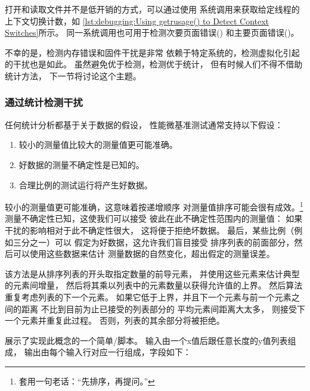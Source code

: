 打开和读取文件并不是低开销的方式，可以通过使用
系统调用来获取给定线程的上下文切换计数，如
\cref{lst:debugging:Using getrusage() to Detect Context Switches}所示。
同一系统调用也可用于检测次要页面错误()
和主要页面错误()。

不幸的是，检测内存错误和固件干扰是非常
依赖于特定系统的，检测虚拟化引起的干扰也是如此。
虽然避免优于检测，检测优于统计，
但有时候人们不得不借助统计方法，
下一节将讨论这个主题。

\subsubsection{通过统计检测干扰}
\label{sec:debugging:Detecting Interference Via Statistics}

任何统计分析都基于关于数据的假设，
性能微基准测试通常支持以下假设：

\begin{enumerate}
\item	较小的测量值比较大的测量值更可能准确。
\item	好数据的测量不确定性是已知的。
\item	合理比例的测试运行将产生好数据。
\end{enumerate}

较小的测量值更可能准确，这意味着按递增顺序
对测量值排序可能会很有成效。\footnote{
	套用一句老话：``先排序，再提问。''}
测量不确定性已知，这使我们可以接受
彼此在此不确定性范围内的测量值：
如果干扰的影响相对于此不确定性很大，
这将便于拒绝坏数据。
最后，某些比例（例如三分之一）可以
假定为好数据，这允许我们盲目接受
排序列表的前面部分，然后可以使用这些数据来估计
测量数据的自然变化，超出假定的测量误差。

该方法是从排序列表的开头取指定数量的前导元素，
并使用这些元素来估计典型的元素间增量，
然后将其乘以列表中的元素数量以获得允许值的上界。
然后算法重复考虑列表的下一个元素。
如果它低于上界，并且下一个元素与前一个元素之间的距离
不比到目前为止已接受的列表部分的
平均元素间距离大太多，
则接受下一个元素并重复此过程。
否则，列表的其余部分将被拒绝。

\begin{listing}

\caption{干扰的统计消除}
\label{lst:debugging:Statistical Elimination of Interference}
\end{listing}

展示了实现此概念的一个简单/脚本。
输入由一个x值后跟任意长度的y值列表组成，
输出由每个输入行对应一行组成，字段如下：

